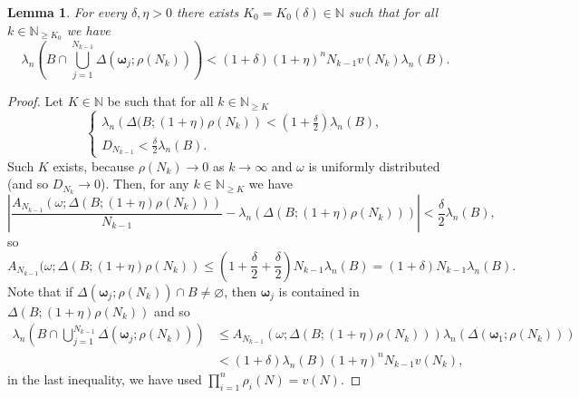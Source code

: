 \documentclass{amsart}
\newtheorem{lemma}[theorem]{Lemma}
\theoremstyle{definition}
\newcommand{\N}{\mathbb N}%
\newcommand{\0}{\mbf 0}%
\def\N{\mathbb N}
\begin{document}
\begin{lemma}\label{standard cover}
For every $\delta,\eta>0$ there exists $K_0=K_0(\delta)\in\N$ such that for all $k\in \mathbb{N}_{\geq K_0}$ we have
\[
\lambda_n\left( B\cap \bigcup_{j=1}^{N_{k-1}} \Delta(\boldsymbol{\omega}_j; \rho(N_{k}))\right)
<
(1+\delta) (1+\eta)^n N_{k-1}v(N_k)\lambda_n(B).
\]
\end{lemma}
\begin{proof}
Let $K\in \N$ be such that for all $k\in\mathbb{N}_{\geq K}$
\[
\begin{cases}
\lambda_n\left( \Delta(B;(1+\eta)\rho(N_k)\right)
< 
\left(1+\frac{\delta}{2}\right) \lambda_n(B), \\
D_{N_{k-1}}
< 
\frac{\delta}{2}
\lambda_n(B).
\end{cases}
\]
Such $K$ exists, because $\rho(N_k)\to 0$ as $k\to\infty$ and $\omega$ is uniformly distributed (and so $D_{N_{k}}\to 0$). Then, for any $k\in\N_{\geq K}$ we have
\[
\left| 
\frac{A_{N_{k-1}}(\omega;\Delta(B;(1+\eta)\rho(N_k)))}{N_{k-1}}
-
\lambda_n\left( \Delta(B;(1+\eta)\rho(N_k) ) \right)
\right|
< \frac{\delta}{2}\lambda_n(B),
\]
so 
\[
A_{N_{k-1}}(\omega;\Delta(B;(1+\eta)\rho(N_k))  
\leq 
\left(1 + \frac{\delta}{2} + \frac{\delta}{2} \right)N_{k-1} \lambda_n(B)
=
(1+\delta)N_{k-1} \lambda_n(B).
\]
Note that if $\Delta(\boldsymbol{\omega}_j; \rho(N_{k})) \cap B\neq \varnothing$, then $\boldsymbol{\omega}_j$ is contained in $\Delta(B;(1+\eta)\rho(N_k))$ and so
\begin{align*}
\lambda_n\left( B\cap \bigcup_{j=1}^{N_{k-1}} \Delta(\boldsymbol{\omega}_j; \rho(N_{k}))\right)
&\leq 
A_{N_{k-1}}\left(\omega ;\Delta(B;(1+\eta)\rho(N_k))\right)\lambda_n\left( \Delta(\boldsymbol{\omega}_{1};\rho(N_k) )\right) \\
&<
(1+\delta) \lambda_n(B) (1+\eta)^n N_{k-1}v(N_k),
\end{align*}
in the last inequality, we have used $\prod_{i=1}^{n}\rho_{i}(N)=v(N)$.
\end{proof}
\end{document}
